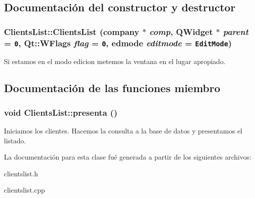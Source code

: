 \subsection{Documentaci\'{o}n del constructor y destructor}
\subsubsection{\setlength{\rightskip}{0pt plus 5cm}Clients\-List::Clients\-List ({\bf company} $\ast$ {\em comp}, QWidget $\ast$ {\em parent} = {\tt 0}, Qt::WFlags {\em flag} = {\tt 0}, edmode {\em editmode} = {\tt EditMode})}\label{classClientsList_a1}


Si estamos en el modo edicion metemos la ventana en el lugar apropiado. 

\subsection{Documentaci\'{o}n de las funciones miembro}
\subsubsection{\setlength{\rightskip}{0pt plus 5cm}void Clients\-List::presenta ()}\label{classClientsList_a8}


Iniciamos los clientes. Hacemos la consulta a la base de datos y presentamos el listado. 

La documentaci\'{o}n para esta clase fu\'{e} generada a partir de los siguientes archivos:\begin{CompactItemize}
\item 
clientslist.h\item 
clientslist.cpp\end{CompactItemize}

